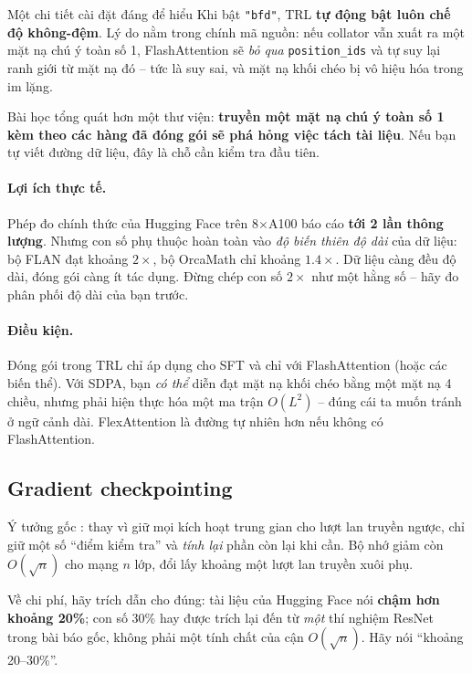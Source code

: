 \begin{deepdive}{Một chi tiết cài đặt đáng để hiểu}
Khi bật \texttt{"bfd"}, TRL \textbf{tự động bật luôn chế độ không-đệm}. Lý do nằm trong chính mã nguồn: nếu collator vẫn xuất ra một mặt nạ chú ý toàn số 1, FlashAttention sẽ \emph{bỏ qua} \texttt{position\_ids} và tự suy lại ranh giới từ mặt nạ đó -- tức là suy sai, và mặt nạ khối chéo bị vô hiệu hóa trong im lặng.

Bài học tổng quát hơn một thư viện: \textbf{truyền một mặt nạ chú ý toàn số 1 kèm theo các hàng đã đóng gói sẽ phá hỏng việc tách tài liệu}. Nếu bạn tự viết đường dữ liệu, đây là chỗ cần kiểm tra đầu tiên.
\end{deepdive}

\paragraph{Lợi ích thực tế.} Phép đo chính thức của Hugging Face trên 8$\times$A100 báo cáo \textbf{tới 2 lần thông lượng}. Nhưng con số phụ thuộc hoàn toàn vào \emph{độ biến thiên độ dài} của dữ liệu: bộ FLAN đạt khoảng $2\times$, bộ OrcaMath chỉ khoảng $1.4\times$. Dữ liệu càng đều độ dài, đóng gói càng ít tác dụng. Đừng chép con số $2\times$ như một hằng số -- hãy đo phân phối độ dài của bạn trước.

\paragraph{Điều kiện.} Đóng gói trong TRL chỉ áp dụng cho SFT và chỉ với FlashAttention (hoặc các biến thể). Với SDPA, bạn \emph{có thể} diễn đạt mặt nạ khối chéo bằng một mặt nạ 4 chiều, nhưng phải hiện thực hóa một ma trận $O(L^2)$ -- đúng cái ta muốn tránh ở ngữ cảnh dài. FlexAttention là đường tự nhiên hơn nếu không có FlashAttention.

\subsection{Gradient checkpointing}
\label{ssec:grad_ckpt}

Ý tưởng gốc \cite{chen2016sublinear}: thay vì giữ mọi kích hoạt trung gian cho lượt lan truyền ngược, chỉ giữ một số “điểm kiểm tra” và \emph{tính lại} phần còn lại khi cần. Bộ nhớ giảm còn $O(\sqrt{n})$ cho mạng $n$ lớp, đổi lấy khoảng một lượt lan truyền xuôi phụ.

Về chi phí, hãy trích dẫn cho đúng: tài liệu của Hugging Face nói \textbf{chậm hơn khoảng 20\%}; con số 30\% hay được trích lại đến từ \emph{một} thí nghiệm ResNet trong bài báo gốc, không phải một tính chất của cận $O(\sqrt{n})$. Hãy nói “khoảng 20--30\%”.

